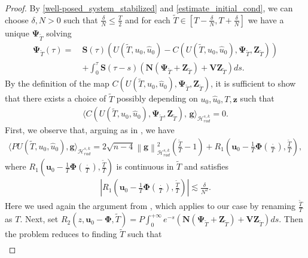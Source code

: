 \documentclass[12pt,reqno]{amsart}
\theoremstyle{plain}
\theoremstyle{remark}
\theoremstyle{plain}
\theoremstyle{definition}
\numberwithin{equation}{section}
\numberwithin{equation}{section}
\newcommand{\norm}[1]{\left\|#1\right\|}
\newcommand{\HH}{\mathcal{H}}
\begin{document}
	\begin{proof}
		By \autoref{well-posed_system_stabilized} and \autoref{estimate_initial_cond}, we can choose  $\delta,N>0$ such that $\frac{\delta}{N}\leq \frac{T}{2}$ and for each $\tilde{T}\in [T-\frac{\delta}{N},T+\frac{\delta}{N}]$ we have a unique $\mathbf{\Psi}_{\tilde{T}}$ solving
		\begin{align*}
			\mathbf{\Psi}_{\tilde{T}}(\tau)=\ &\mathbf{S}(\tau)\left(U(\tilde{T}, u_0, \hat{u}_0)-C(U(\tilde{T}, u_0, \hat{u}_0),\mathbf{\Psi}_{\tilde{T}},\mathbf{Z}_{\tilde{T}})\right)  \\ &
			+\int_0^\tau \mathbf{S}(\tau-s)\left(\mathbf{N}(\mathbf{\Psi}_{\tilde{T}}+\mathbf{Z}_{\tilde{T}})+\mathbf{V}\mathbf{Z}_{\tilde{T}}\right) ds.
		\end{align*}
		By the definition of the map $C(U(\tilde{T}, u_0, \hat{u}_0),\mathbf{\Psi}_{\tilde{T}},\mathbf{Z}_{\tilde{T}})$,  it is sufficient to show that there exists a choice of $\tilde{T}$ possibly depending on $u_0, \hat{u}_0,T, \mathbf{z}$ such that
		\begin{align*}
			\langle C(U(\tilde{T}, u_0, \hat{u}_0),\mathbf{\Psi}_{\tilde{T}},\mathbf{Z}_{\tilde{T}}),\,\mathbf{g}\rangle_{\HH_{rad}^{s,k}}=0.
		\end{align*}
		First, we observe that, arguing as in \cite[Lemma 8.2]{glogic2025globally}, we have
		\begin{align*}
			\langle PU(\tilde{T}, u_0, \hat{u}_0),\mathbf{g}\rangle_{\HH_{rad}^{s,k}}=2\sqrt{n-4}\norm{\mathbf{g}}_{\HH_{rad}^{s,k}}^2\left(\frac{\tilde{T}}{T}-1\right)+R_{1}\left(\mathbf{u}_0-\frac{1}{T}\mathbf{\Phi}\left(\frac{\cdot}{T}\right),\frac{\tilde{T}}{T}\right),
		\end{align*}
		where $R_{1}(\mathbf{u}_0-\frac{1}{T}\mathbf{\Phi}\left(\frac{\cdot}{T}\right),\frac{\tilde{T}}{T})$ is continuous in $\tilde{T}$ and satisfies \begin{align*}
			\left\lvert R_{1}\left(\mathbf{u}_0-\frac{1}{T}\mathbf{\Phi}\left(\frac{\cdot}{T}\right),\frac{\tilde{T}}{T}\right) \right\rvert\lesssim \frac{\delta}{N^2}.  
		\end{align*}
		Here we used again the argument from \cite[Lemma 8.2]{glogic2025globally}, which applies to our case by renaming $\frac{\tilde{T}}{T}$ as $T$.
		Next, set $R_2(z,\mathbf{u}_0-\mathbf{\Phi},\tilde{T})=P\int_0^{+\infty}  e^{-s}\left(\mathbf{N}(\mathbf{\Psi}_{\tilde{T}}+\mathbf{Z}_{\tilde{T}})+\mathbf{V}\mathbf{Z}_{\tilde{T}}\right) ds$. Then the problem reduces to finding $\tilde{T}$ such that \begin{align*}

\end{align*}
\end{proof}
\end{document}
